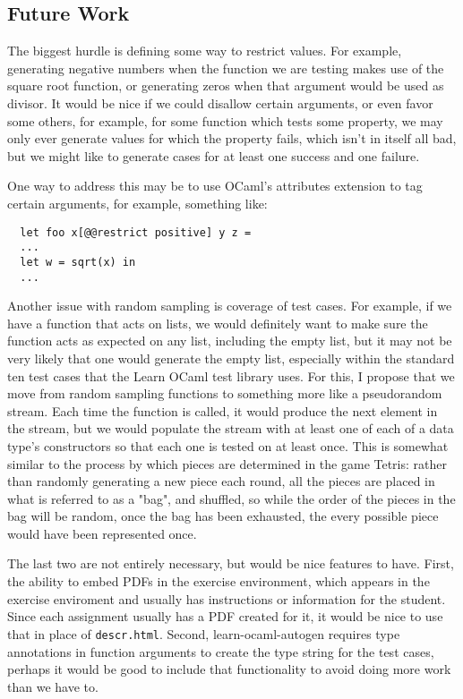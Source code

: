 \documentclass[11pt]{article}
\begin{document}
\subsection{Future Work}
The biggest hurdle is defining some way to restrict values. For example, generating negative numbers when the function we are testing makes use of the square root function, or generating zeros when that argument would be used as divisor. It would be nice if we could disallow certain arguments, or even favor some others, for example, for some function which tests some property, we may only ever generate values for which the property fails, which isn't in itself all bad, but we might like to generate cases for at least one success and one failure.

One way to address this may be to use OCaml's attributes extension to tag certain arguments, for example, something like:

\begin{lstlisting}
  let foo x[@@restrict positive] y z =
  ...
  let w = sqrt(x) in
  ...
\end{lstlisting}

Another issue with random sampling is coverage of test cases. For example, if we have a function that acts on lists, we would definitely want to make sure the function acts as expected on any list, including the empty list, but it may not be very likely that one would generate the empty list, especially within the standard ten test cases that the Learn OCaml test library uses. For this, I propose that we move from random sampling functions to something more like a pseudorandom stream. Each time the function is called, it would produce the next element in the stream, but we would populate the stream with at least one of each of a data type's constructors so that each one is tested on at least once. This is somewhat similar to the process by which pieces are determined in the game Tetris: rather than randomly generating a new piece each round, all the pieces are placed in what is referred to as a "bag", and shuffled, so while the order of the pieces in the bag will be random, once the bag has been exhausted, the every possible piece would have been represented once.

The last two are not entirely necessary, but would be nice features to have. First, the ability to embed PDFs in the exercise environment, which appears in the exercise enviroment and usually has instructions or information for the student. Since each assignment usually has a PDF created for it, it would be nice to use that in place of \verb+descr.html+. Second, learn-ocaml-autogen requires type annotations in function arguments to create the type string for the test cases, perhaps it would be good to include that functionality to avoid doing more work than we have to.

{}

\end{document}
